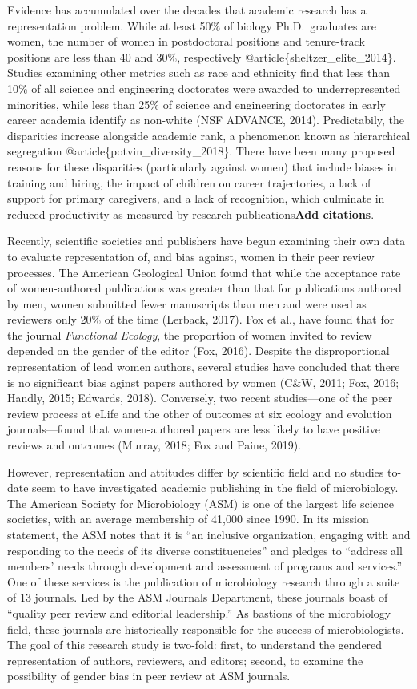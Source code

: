 \documentclass[11pt,]{article}
\begin{document}
Evidence has accumulated over the decades that academic research has a
representation problem. While at least 50\% of biology Ph.D.~graduates
are women, the number of women in postdoctoral positions and
tenure-track positions are less than 40 and 30\%, respectively
@article\{sheltzer\_elite\_2014\}. Studies examining other metrics such
as race and ethnicity find that less than 10\% of all science and
engineering doctorates were awarded to underrepresented minorities,
while less than 25\% of science and engineering doctorates in early
career academia identify as non-white (NSF ADVANCE, 2014). Predictabily,
the disparities increase alongside academic rank, a phenomenon known as
hierarchical segregation @article\{potvin\_diversity\_2018\}. There have
been many proposed reasons for these disparities (particularly against
women) that include biases in training and hiring, the impact of
children on career trajectories, a lack of support for primary
caregivers, and a lack of recognition, which culminate in reduced
productivity as measured by research publications\textbf{Add citations}.

Recently, scientific societies and publishers have begun examining their
own data to evaluate representation of, and bias against, women in their
peer review processes. The American Geological Union found that while
the acceptance rate of women-authored publications was greater than that
for publications authored by men, women submitted fewer manuscripts than
men and were used as reviewers only 20\% of the time (Lerback, 2017).
Fox et al., have found that for the journal \emph{Functional Ecology},
the proportion of women invited to review depended on the gender of the
editor (Fox, 2016). Despite the disproportional representation of lead
women authors, several studies have concluded that there is no
significant bias aginst papers authored by women (C\&W, 2011; Fox, 2016;
Handly, 2015; Edwards, 2018). Conversely, two recent studies---one of
the peer review process at eLife and the other of outcomes at six
ecology and evolution journals---found that women-authored papers are
less likely to have positive reviews and outcomes (Murray, 2018; Fox and
Paine, 2019).

However, representation and attitudes differ by scientific field and no
studies to-date seem to have investigated academic publishing in the
field of microbiology. The American Society for Microbiology (ASM) is
one of the largest life science societies, with an average membership of
41,000 since 1990. In its mission statement, the ASM notes that it is
``an inclusive organization, engaging with and responding to the needs
of its diverse constituencies'' and pledges to ``address all members'
needs through development and assessment of programs and services.'' One
of these services is the publication of microbiology research through a
suite of 13 journals. Led by the ASM Journals Department, these journals
boast of ``quality peer review and editorial leadership.'' As bastions
of the microbiology field, these journals are historically responsible
for the success of microbiologists. The goal of this research study is
two-fold: first, to understand the gendered representation of authors,
reviewers, and editors; second, to examine the possibility of gender
bias in peer review at ASM journals.
\end{document}
